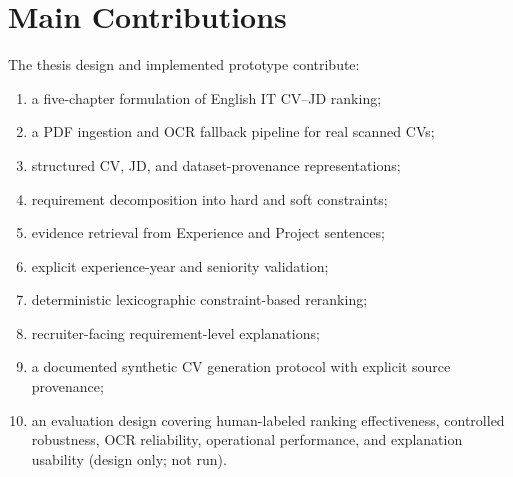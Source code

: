 \documentclass[12pt,a4paper,oneside]{report}
\begin{document}
\section{Main Contributions}
The thesis design and implemented prototype contribute:
\begin{enumerate}
  \item a five-chapter formulation of English IT CV--JD ranking;
  \item a PDF ingestion and OCR fallback pipeline for real scanned CVs;
  \item structured CV, JD, and dataset-provenance representations;
  \item requirement decomposition into hard and soft constraints;
  \item evidence retrieval from Experience and Project sentences;
  \item explicit experience-year and seniority validation;
  \item deterministic lexicographic constraint-based reranking;
  \item recruiter-facing requirement-level explanations;
  \item a documented synthetic CV generation protocol with explicit source provenance;
  \item an evaluation design covering human-labeled ranking effectiveness, controlled robustness, OCR reliability, operational performance, and explanation usability (design only; not run).
\end{enumerate}
\end{document}
